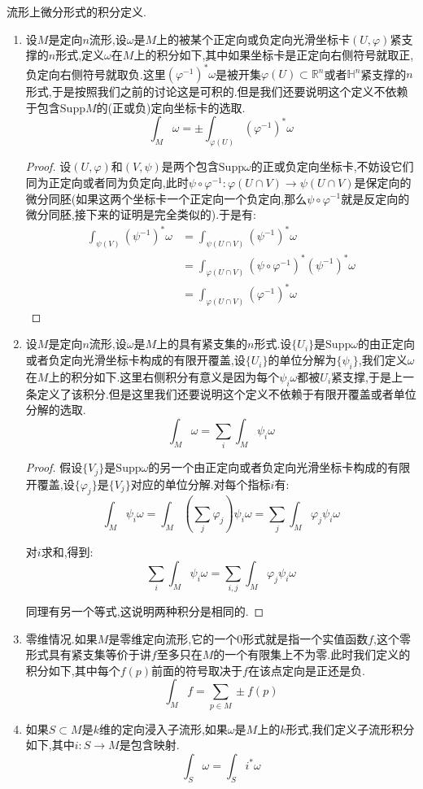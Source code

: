 流形上微分形式的积分定义.
\begin{enumerate}
	\item 设$M$是定向$n$流形,设$\omega$是$M$上的被某个正定向或负定向光滑坐标卡$(U,\varphi)$紧支撑的$n$形式,定义$\omega$在$M$上的积分如下,其中如果坐标卡是正定向右侧符号就取正,负定向右侧符号就取负.这里$(\varphi^{-1})^*\omega$是被开集$\varphi(U)\subset\mathbb{R}^n$或者$\mathbb{H}^n$紧支撑的$n$形式,于是按照我们之前的讨论这是可积的.但是我们还要说明这个定义不依赖于包含$\mathrm{Supp}M$的(正或负)定向坐标卡的选取.
	$$\int_M\omega=\pm\int_{\varphi(U)}(\varphi^{-1})^*\omega$$
	\begin{proof}
		
		设$(U,\varphi)$和$(V,\psi)$是两个包含$\mathrm{Supp}\omega$的正或负定向坐标卡,不妨设它们同为正定向或者同为负定向,此时$\psi\circ\varphi^{-1}:\varphi(U\cap V)\to\psi(U\cap V)$是保定向的微分同胚(如果这两个坐标卡一个正定向一个负定向,那么$\psi\circ\varphi^{-1}$就是反定向的微分同胚,接下来的证明是完全类似的).于是有:
		\begin{align*}
		\int_{\psi(V)}(\psi^{-1})^*\omega&=\int_{\psi(U\cap V)}(\psi^{-1})^*\omega\\&=\int_{\varphi(U\cap V)}(\psi\circ\varphi^{-1})^*(\psi^{-1})^*\omega\\&=\int_{\varphi(U\cap V)}(\varphi^{-1})^*\omega
		\end{align*}
	\end{proof}
    \item 设$M$是定向$n$流形,设$\omega$是$M$上的具有紧支集的$n$形式.设$\{U_i\}$是$\mathrm{Supp}\omega$的由正定向或者负定向光滑坐标卡构成的有限开覆盖,设$\{U_i\}$的单位分解为$\{\psi_i\}$,我们定义$\omega$在$M$上的积分如下.这里右侧积分有意义是因为每个$\psi_i\omega$都被$U_i$紧支撑,于是上一条定义了该积分.但是这里我们还要说明这个定义不依赖于有限开覆盖或者单位分解的选取.
    $$\int_M\omega=\sum_i\int_M\psi_i\omega$$
    \begin{proof}
    	
    	假设$\{V_j\}$是$\mathrm{Supp}\omega$的另一个由正定向或者负定向光滑坐标卡构成的有限开覆盖,设$\{\varphi_j\}$是$\{V_j\}$对应的单位分解.对每个指标$i$有:
    	$$\int_M\psi_i\omega=\int_M(\sum_j\varphi_j)\psi_i\omega=\sum_j\int_M\varphi_j\psi_i\omega$$
    	
    	对$i$求和,得到:$$\sum_i\int_M\psi_i\omega=\sum_{i,j}\int_M\varphi_j\psi_i\omega$$
    	
    	同理有另一个等式,这说明两种积分是相同的.
    \end{proof}
    \item 零维情况.如果$M$是零维定向流形,它的一个0形式就是指一个实值函数$f$,这个零形式具有紧支集等价于讲$f$至多只在$M$的一个有限集上不为零.此时我们定义的积分如下,其中每个$f(p)$前面的符号取决于$f$在该点定向是正还是负.
    $$\int_Mf=\sum_{p\in M}\pm f(p)$$
    \item 如果$S\subset M$是$k$维的定向浸入子流形,如果$\omega$是$M$上的$k$形式,我们定义子流形积分如下,其中$i:S\to M$是包含映射.$$\int_S\omega=\int_Si^*\omega$$
\end{enumerate}

